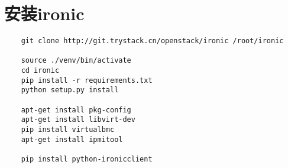 \documentclass[a4paper,left=1.5cm,right=1.5cm,11pt]{article}
\begin{document}
\tableofcontents

\clearpage

\section{安装ironic}
	\begin{lstlisting}
	git clone http://git.trystack.cn/openstack/ironic /root/ironic

	source ./venv/bin/activate
	cd ironic
	pip install -r requirements.txt
	python setup.py install

	apt-get install pkg-config
	apt-get install libvirt-dev
	pip install virtualbmc
	apt-get install ipmitool

	pip install python-ironicclient
	\end{lstlisting}
\end{document}
